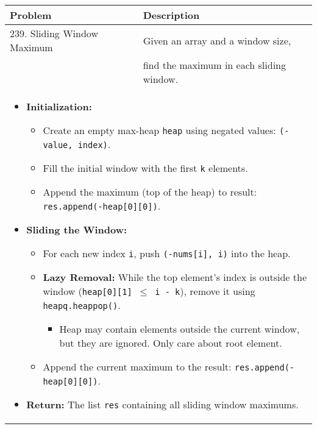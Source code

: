 \begin{summary}
    \begin{center}
        \begin{tabular}{ll}
            \toprule
            \textbf{Problem} & \textbf{Description} \\
            \midrule
            239. Sliding Window Maximum & Given an array and a window size, \\
            & find the maximum in each sliding window. \\
            \multicolumn{2}{p{\linewidth}}{
                \begin{itemize}
                    \item \textbf{Initialization:}
                    \begin{itemize}
                        \item Create an empty max-heap \texttt{heap} using negated values: \texttt{(-value, index)}.
                        \item Fill the initial window with the first \texttt{k} elements.
                        \item Append the maximum (top of the heap) to result: \texttt{res.append(-heap[0][0])}.
                    \end{itemize}
                    \item \textbf{Sliding the Window:}
                    \begin{itemize}
                        \item For each new index \texttt{i}, push \texttt{(-nums[i], i)} into the heap.
                        \item \textbf{Lazy Removal:} While the top element’s index is outside the window (\texttt{heap[0][1] $\leq$ i - k}), remove it using \texttt{heapq.heappop()}.
                        \begin{itemize}
                            \item Heap may contain elements outside the current window, but they are ignored. Only care about root element.
                        \end{itemize}
                        \item Append the current maximum to the result: \texttt{res.append(-heap[0][0])}.
                    \end{itemize}
                    \item \textbf{Return:} The list \texttt{res} containing all sliding window maximums.
                \end{itemize}                
                } \\
            \midrule
        \end{tabular}
    \end{center}
\end{summary}
